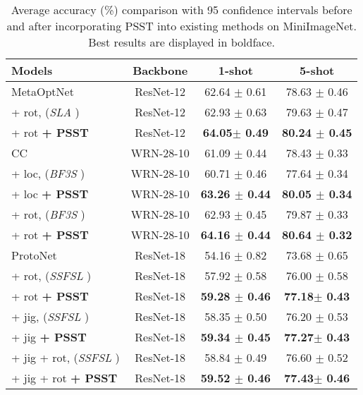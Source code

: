 \documentclass[final]{cvpr}
\begin{document}
\begin{table*}[]
	
	\centering 
	\begin{tabular}{l|c|c|c}
		\toprule[2pt]
		Models &	Backbone	&	1-shot	& 5-shot     \\ 
		\hline
		\hline
		MetaOptNet \cite{LeeMRS19}& ResNet-12 &62.64 $\pm$  0.61& 78.63 $\pm$  0.46 \\
		\quad  + rot, (\textit{SLA} \cite{lee20_sla}) & ResNet-12 &62.93 $\pm$  0.63  & 79.63 $\pm$  0.47    \\
		\quad  + rot\textbf{ + PSST} & ResNet-12 & \textbf{64.05$\pm$ 0.49  }  &  \textbf{80.24 $\pm$ 0.45   } \\
		
		\hline
		\hline
		
		CC   ~\cite{GidarisK18}      & WRN-28-10 &    61.09 $\pm$ 0.44  & 78.43 $\pm$ 0.33      \\
		\quad  + loc, (\textit{BF3S} \cite{GidarisBKPC19})  & WRN-28-10    & 60.71  $\pm$ 0.46  &  77.64 $\pm$ 0.34    \\
		\quad  + loc\textbf{ + PSST}  & WRN-28-10 &  \textbf{63.26 $\pm$ 0.44  } &\textbf{80.05 $\pm$ 0.34  }     \\
		\hline
		\quad  + rot, (\textit{BF3S} \cite{GidarisBKPC19})  & WRN-28-10 &  62.93 $\pm$ 0.45  &  79.87 $\pm$ 0.33   \\
		\quad  + rot\textbf{ + PSST} & WRN-28-10 &  \textbf{64.16 $\pm$ 0.44 } &\textbf{80.64 $\pm$ 0.32   }      \\
		\hline
		\hline
		ProtoNet \cite{SnellSZ17}& ResNet-18 &54.16 $\pm$  0.82&  73.68 $\pm$  0.65 \\
		\quad  + rot, (\textit{SSFSL} \cite{SuMH20}) & ResNet-18 &57.92 $\pm$  0.58  & 76.00 $\pm$  0.58   \\
		\quad  + rot\textbf{ + PSST} & ResNet-18 & \textbf{59.28 $\pm$ 0.46   }&   \textbf{77.18$\pm$ 0.43    }\\
		\hline
		\quad  + jig, (\textit{SSFSL} \cite{SuMH20}) & ResNet-18 &58.35 $\pm$  0.50   & 76.20 $\pm$  0.53   \\
		\quad  + jig\textbf{ + PSST} & ResNet-18 &\textbf{59.34 $\pm$ 0.45  }&   \textbf{77.27$\pm$ 0.43   } \\
		\hline 
		\quad  + jig + rot, (\textit{SSFSL} \cite{SuMH20}) & ResNet-18 &58.84 $\pm$  0.49    & 76.60 $\pm$  0.52    \\
		\quad  + jig + rot \textbf{ + PSST} & ResNet-18 &\textbf{59.52 $\pm$ 0.46  }&   \textbf{77.43$\pm$ 0.46  }  \\
		\bottomrule[2pt]
	\end{tabular} 
	\caption{ Average accuracy (\%) comparison with 95 confidence intervals before and after incorporating PSST into existing methods 
		on MiniImageNet. Best results are displayed in boldface.  
	}\label{PSST}
\end{table*}
\end{document}
